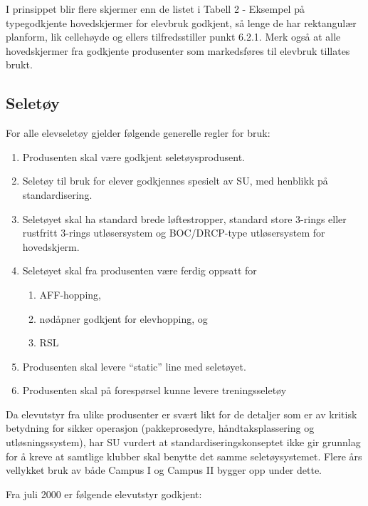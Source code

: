 I prinsippet blir flere skjermer enn de listet i Tabell 2 - Eksempel på typegodkjente hovedskjermer for elevbruk godkjent, så lenge de har rektangulær planform, lik cellehøyde og ellers tilfredsstiller punkt 6.2.1. Merk også at alle hovedskjermer fra godkjente produsenter som markedsføres til elevbruk tillates brukt.

\subsection{Seletøy}
For alle elevseletøy gjelder følgende generelle regler for bruk:
\begin{enumerate}
	\item Produsenten skal være godkjent seletøysprodusent.
	\item Seletøy til bruk for elever godkjennes spesielt av SU, med henblikk på standardisering.
	\item Seletøyet skal ha standard brede løftestropper, standard store 3-rings eller rustfritt 3-rings utløsersystem og BOC/DRCP-type utløsersystem for hovedskjerm.
	\item Seletøyet skal fra produsenten være ferdig oppsatt for
	\begin{enumerate}
		\item AFF-hopping,
		\item nødåpner godkjent for elevhopping, og
		\item RSL
	\end{enumerate}
	\item Produsenten skal levere ``static'' line med seletøyet.
	\item Produsenten skal på forespørsel kunne levere treningsseletøy
\end{enumerate}

Da elevutstyr fra ulike produsenter er svært likt for de detaljer som er av kritisk betydning for sikker operasjon (pakkeprosedyre, håndtaksplassering og utløsningssystem), har SU vurdert at standardiseringskonseptet ikke gir grunnlag for å kreve at samtlige klubber skal benytte det samme seletøysystemet. Flere års vellykket bruk av både Campus I og Campus II bygger opp under dette.

Fra juli 2000 er følgende elevutstyr godkjent:

